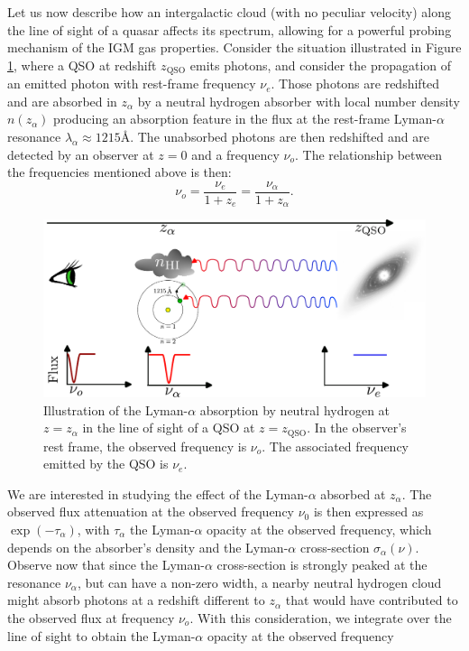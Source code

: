 Let us now describe how an intergalactic cloud (with no peculiar velocity) along the line of sight of a quasar affects its spectrum, allowing for a powerful probing mechanism of the IGM gas properties. Consider the situation illustrated in Figure \ref{fig_ch1:Lyman_alpha_diagram}, where a QSO at redshift $z_\text{QSO}$ emits photons, and consider the propagation of an emitted photon with rest-frame frequency $\nu_e$. Those photons are redshifted and are absorbed in $z_\alpha$ by a neutral hydrogen absorber with local number density $n(z_\alpha)$ producing an absorption feature in the flux at the rest-frame Lyman-$\alpha$ resonance $\lambda_\alpha \approx 1215$\r{A}. The unabsorbed photons are then redshifted and are detected by an observer at $z=0$ and a frequency $\nu_o$. The relationship between the frequencies mentioned above is then:
\begin{equation}
    \nu_o=\frac{\nu_e}{1+z_e}=\frac{\nu_\alpha}{1+z_\alpha}. 
\end{equation}

\begin{figure}[t]
    \centering
    \includegraphics[width=1\linewidth]{img/lyman-alpha.pdf}
    \caption{Illustration of the Lyman-$\alpha$ absorption by neutral hydrogen at $z=z_\alpha$ in the line of sight of a QSO at $z=z_{\text{QSO}}$. In the observer's rest frame, the observed frequency is $\nu_o$. The associated frequency emitted by the QSO is $\nu_e$. }
    \label{fig_ch1:Lyman_alpha_diagram}
\end{figure}
We are interested in studying the effect of the Lyman-$\alpha$ absorbed at $z_\alpha$. The observed flux attenuation at the observed frequency $\nu_0$ is then expressed as $\exp(-\tau_\alpha)$, with $\tau_\alpha$ the Lyman-$\alpha$ opacity at the observed frequency, which depends on the absorber's density and the Lyman-$\alpha$ cross-section $\sigma_\alpha(\nu)$. Observe now that since the Lyman-$\alpha$ cross-section is strongly peaked at the resonance $\nu_\alpha$, but can have a non-zero width, a nearby neutral hydrogen cloud might absorb photons at a redshift different to $z_\alpha$ that would have contributed to the observed flux at frequency $\nu_o$. With this consideration, we integrate over the line of sight to obtain the Lyman-$\alpha$ opacity at the observed frequency

